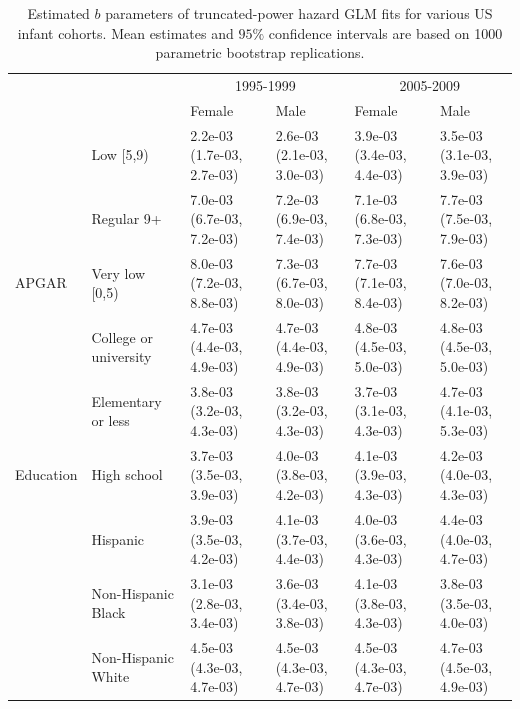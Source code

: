 \documentclass[smallextended]{svjour3} %
\begin{document}
\begin{landscape}\begin{table}[t]

\caption{\label{tab:tab-ci-b}Estimated $b$ parameters of truncated-power hazard GLM fits for various US infant cohorts. Mean estimates and $95\%$ confidence intervals are based on 1000 parametric bootstrap replications.}
\centering
\begin{tabular}{llllll}
\toprule
\multicolumn{2}{c}{ } & \multicolumn{2}{c}{1995-1999} & \multicolumn{2}{c}{2005-2009} \\
\cmidrule(l{3pt}r{3pt}){3-4} \cmidrule(l{3pt}r{3pt}){5-6}
 &  & Female & Male & Female & Male\\
\midrule
 & Low [5,9) & 2.2e-03 (1.7e-03, 2.7e-03) & 2.6e-03 (2.1e-03, 3.0e-03) & 3.9e-03 (3.4e-03, 4.4e-03) & 3.5e-03 (3.1e-03, 3.9e-03)\\

 & Regular 9+ & 7.0e-03 (6.7e-03, 7.2e-03) & 7.2e-03 (6.9e-03, 7.4e-03) & 7.1e-03 (6.8e-03, 7.3e-03) & 7.7e-03 (7.5e-03, 7.9e-03)\\

\multirow{-3}{*}{\raggedright\arraybackslash APGAR} & Very low [0,5) & 8.0e-03 (7.2e-03, 8.8e-03) & 7.3e-03 (6.7e-03, 8.0e-03) & 7.7e-03 (7.1e-03, 8.4e-03) & 7.6e-03 (7.0e-03, 8.2e-03)\\
\cmidrule{1-6}
 & College or university & 4.7e-03 (4.4e-03, 4.9e-03) & 4.7e-03 (4.4e-03, 4.9e-03) & 4.8e-03 (4.5e-03, 5.0e-03) & 4.8e-03 (4.5e-03, 5.0e-03)\\

 & Elementary or less & 3.8e-03 (3.2e-03, 4.3e-03) & 3.8e-03 (3.2e-03, 4.3e-03) & 3.7e-03 (3.1e-03, 4.3e-03) & 4.7e-03 (4.1e-03, 5.3e-03)\\

\multirow{-3}{*}{\raggedright\arraybackslash Education} & High school & 3.7e-03 (3.5e-03, 3.9e-03) & 4.0e-03 (3.8e-03, 4.2e-03) & 4.1e-03 (3.9e-03, 4.3e-03) & 4.2e-03 (4.0e-03, 4.3e-03)\\
\cmidrule{1-6}
 & Hispanic & 3.9e-03 (3.5e-03, 4.2e-03) & 4.1e-03 (3.7e-03, 4.4e-03) & 4.0e-03 (3.6e-03, 4.3e-03) & 4.4e-03 (4.0e-03, 4.7e-03)\\

 & Non-Hispanic Black & 3.1e-03 (2.8e-03, 3.4e-03) & 3.6e-03 (3.4e-03, 3.8e-03) & 4.1e-03 (3.8e-03, 4.3e-03) & 3.8e-03 (3.5e-03, 4.0e-03)\\

 & Non-Hispanic White & 4.5e-03 (4.3e-03, 4.7e-03) & 4.5e-03 (4.3e-03, 4.7e-03) & 4.5e-03 (4.3e-03, 4.7e-03) & 4.7e-03 (4.5e-03, 4.9e-03)\\


\end{tabular}
\end{table}
\end{landscape}
\end{document}

